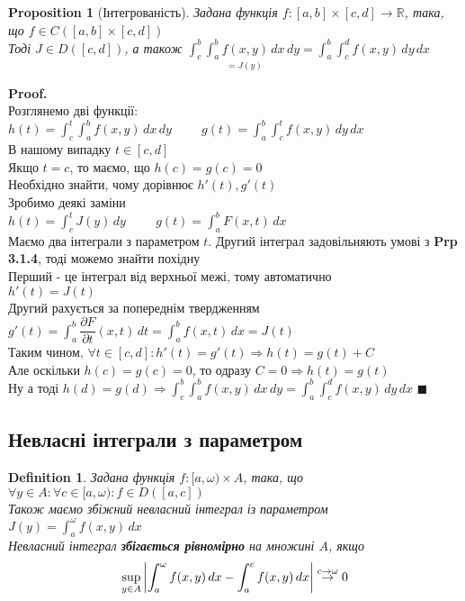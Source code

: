 \documentclass[a4paper, 14pt]{extarticle}
\def\departial#1#2{\dfrac{\partial {#1}}{\partial {#2}}}
\def\huge{\displaystyle}
\theoremstyle{theoremdd}
\theoremstyle{theoremdd}
\newtheorem{definition}[theorem]{Definition}
\theoremstyle{theoremdd}
\newtheorem{proposition}[theorem]{Proposition}
\theoremstyle{theoremdd}
\theoremstyle{theoremdd}
\theoremstyle{theoremdd}
\theoremstyle{theoremdd}
\newenvironment{pf}{\vspace*{-3mm} \textbf{Proof. \\}}{$\blacksquare$}
\begin{document}
\begin{proposition}[Інтегрованість]
Задана функція $f: [a,b] \times [c,d] \to \mathbb{R}$, така, що $f \in C([a,b] \times [c,d])$\\
Тоді $J \in D([c,d])$, а також $\huge \int_c^b \underset{=J(y)}{\int_a^b f(x,y)\,dx}\,dy = \int_a^b \int_c^d f(x,y)\,dy \,dx$
\end{proposition}

\begin{pf}
Розглянемо дві функції: $h(t) = \huge \int_c^t \int_a^b f(x,y) \,dx \,dy \hspace{1cm} g(t) = \int_a^b \int_c^t f(x,y)\,dy\,dx$\\
В нашому випадку $t \in [c,d]$\\
Якщо $t =c$, то маємо, що $h(c) = g(c) = 0$\\
Необхідно знайти, чому дорівнює $h'(t), g'(t)$\\
Зробимо деякі заміни\\
$h(t) = \huge \int_c^t J(y) \,dy \hspace{1cm} g(t) = \int_a^b F(x,t)\,dx$\\
Маємо два інтеграли з параметром $t$. Другий інтеграл задовільняють умові з \textbf{Prp 3.1.4}, тоді можемо знайти похідну\\
Перший - це інтеграл від верхньої межі, тому автоматично\\
$h'(t) = J(t)$\\
Другий рахується за попереднім твердженням\\
$g'(t) = \huge \int_a^b \departial{F}{t}(x,t)\,dt = \huge \int_a^b f(x,t)\,dx = J(t)$\\
Таким чином, $\forall t \in [c,d]: h'(t) = g'(t) \Rightarrow h(t) = g(t) + C$\\
Але оскільки $h(c)=g(c)=0$, то одразу $C=0 \Rightarrow h(t) = g(t)$\\
Ну а тоді $h(d) = g(d) \Rightarrow \huge \int_c^b \int_a^b f(x,y)\,dx\,dy = \int_a^b \int_c^d f(x,y)\,dy \,dx$
\end{pf}

\subsection{Невласні інтеграли з параметром}

\begin{definition}
Задана функція $f: [a,\omega) \times A$, така, що $\forall y \in A: \forall c \in [a,\omega): f\in D([a,c])$\\
Також маємо збіжний невласний інтеграл із параметром $J(y)= \huge \int_a^\omega f(x,y)\,dx$\\
Невласний інтеграл \textbf{збігається рівномірно} на множині $A$, якщо
\begin{align*}
\huge \sup_{y \in A} \abs{\int_a^\omega f(x,y)\,dx - \int_a^c f(x,y)\,dx} \overset{c \to \omega}{\to} 0
\end{align*}
\end{definition}
\end{document}
